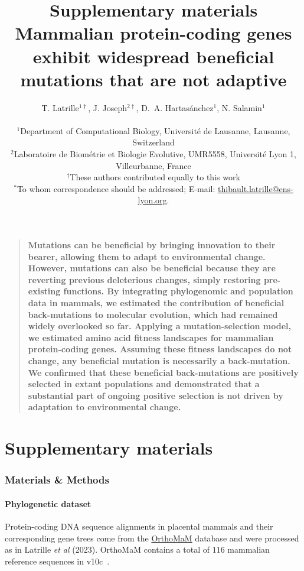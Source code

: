 \documentclass[12pt]{article}
\title{\textbf{Supplementary materials}\\\vspace*{1cm}Mammalian protein-coding genes exhibit widespread beneficial mutations that are not adaptive}
\author
{T. {Latrille}$^{1\dag}$\orcidlink{0000-0002-9643-4668}, J. {Joseph}$^{2\dag}$\orcidlink{0009-0002-1312-9930}, D.~A. {Hartasánchez}$^{1}$\orcidlink{0000-0003-2596-6883}, N. {Salamin}$^{1}$\orcidlink{0000-0002-3963-4954}\\
\\
\normalsize{$^{1}$Department of Computational Biology, Université de Lausanne, Lausanne, Switzerland}\\
\normalsize{$^{2}$Laboratoire de Biométrie et Biologie Evolutive, UMR5558, Université Lyon 1, Villeurbanne, France}\\
\normalsize{$^{\dag}$These authors contributed equally to this work}\\
\normalsize{$^\ast$To whom correspondence should be addressed; E-mail:  \href{mailto:thibault.latrille@ens-lyon.org}{thibault.latrille@ens-lyon.org}.}
}
\date{}
\newenvironment{sciabstract}{%
    \begin{quote} \bf}
    {\end{quote}}
\begin{document}

    \baselineskip24pt


    \maketitle


    \begin{sciabstract}
        Mutations can be beneficial by bringing innovation to their bearer, allowing them to adapt to environmental change.
        However, mutations can also be beneficial because they are reverting previous deleterious changes, simply restoring pre-existing functions.
        By integrating phylogenomic and population data in mammals, we estimated the contribution of beneficial back-mutations to molecular evolution, which had remained widely overlooked so far.
        Applying a mutation-selection model, we estimated amino acid fitness landscapes for mammalian protein-coding genes.
        Assuming these fitness landscapes do not change, any beneficial mutation is necessarily a back-mutation.
        We confirmed that these beneficial back-mutations are positively selected in extant populations and demonstrated that a substantial part of ongoing positive selection is not driven by adaptation to environmental change.
    \end{sciabstract}

    \part*{Supplementary materials}
    \tableofcontents
    \clearpage


    \section{Materials \& Methods}
    \label{sec:methods}

    \subsection{Phylogenetic dataset}\label{subsec:phylo-dataset}

    Protein-coding DNA sequence alignments in placental mammals and their corresponding gene trees come from the \href{https://www.orthomam.univ-montp2.fr}{OrthoMaM} database and were processed as in Latrille \textit{et al} (2023)\cite{latrille_genes_2023}.
    OrthoMaM contains a total of $116$ mammalian reference sequences in v10c~\cite{ranwez_orthomam_2007, douzery_orthomam_2014, scornavacca_orthomam_2019}.
\end{document}
